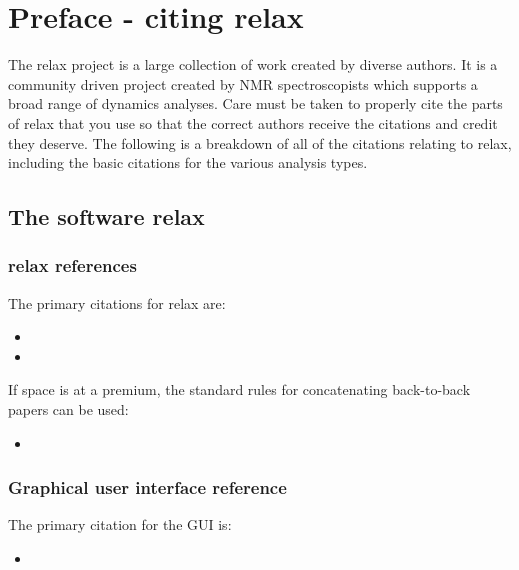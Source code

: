 
\chapter{Preface - citing relax} \label{ch: citations}

The relax project is a large collection of work created by diverse authors.
It is a community driven project created by NMR spectroscopists which supports a broad range of dynamics analyses.
Care must be taken to properly cite the parts of relax that you use so that the correct authors receive the citations and credit they deserve.
The following is a breakdown of all of the citations relating to relax, including the basic citations for the various analysis types.




\section*{The software relax}



\subsection*{relax references}

The primary citations for relax are:
\begin{itemize}
  \item {}
  \item {}
\end{itemize}

If space is at a premium, the standard rules for concatenating back-to-back papers can be used:
\begin{itemize}
  \item {}
\end{itemize}



\subsection*{Graphical user interface reference}

The primary citation for the GUI is:
\begin{itemize}
  \item {}
\end{itemize}


